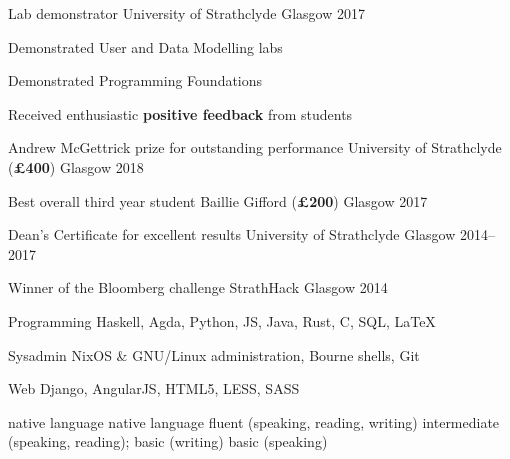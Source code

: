 \documentclass[11pt, a4paper]{awesome-cv}
\begin{document}
\begin{cventries}
    \cventry
      {Lab demonstrator} %
      {University of Strathclyde} %
      {Glasgow} %
      {2017} %
      {
        \begin{cvitems} %
          \item {Demonstrated User and Data Modelling labs}
          \item {Demonstrated Programming Foundations}
          \item {Received enthusiastic \textbf{positive feedback} from students}
        \end{cvitems}
      }

\end{cventries}

\newpage


\begin{cvhonors}
  
    \cvhonor
      {Andrew McGettrick prize for outstanding performance } %
      {University of Strathclyde (\textbf{£400})} %
      {Glasgow} %
      {2018} %
  
    \cvhonor
      {Best overall third year student} %
      {Baillie Gifford (\textbf{£200})} %
      {Glasgow} %
      {2017} %
  
    \cvhonor
      {Dean's Certificate for excellent results} %
      {University of Strathclyde} %
      {Glasgow} %
      {2014--2017} %
  
    \cvhonor
      {Winner of the Bloomberg challenge} %
      {StrathHack} %
      {Glasgow} %
      {2014} %
\end{cvhonors}

\noindent
\begin{minipage}[t]{0.55\linewidth}

\begin{cvskills}
    \cvskill
      {Programming} %
      {Haskell, Agda, Python, JS, Java, Rust, C, SQL, LaTeX} %
  
    \cvskill
      {Sysadmin} %
      {NixOS \& GNU/Linux administration, Bourne shells, Git} %
  
    \cvskill
      {Web} %
      {Django, AngularJS, HTML5, LESS, SASS} %
\end{cvskills}
\end{minipage}%
\hspace{0.05\linewidth}
\begin{minipage}[t]{0.4\linewidth}

\begin{cvskills}
     {native language}
     {native language}
     {fluent (speaking, reading, writing)}
     {
        intermediate (speaking, reading);\newline
        basic (writing)}
     {basic (speaking)}
\end{cvskills}
\end{minipage}
\end{document}
